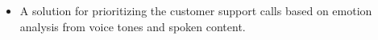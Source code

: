 \documentclass[10pt,a4paper]{altacv}
\begin{document}



\begin{itemize}
\item A solution for prioritizing the customer support calls based on emotion analysis from voice tones and spoken content. 
\end{itemize}
%
\clearpage



\end{document}
